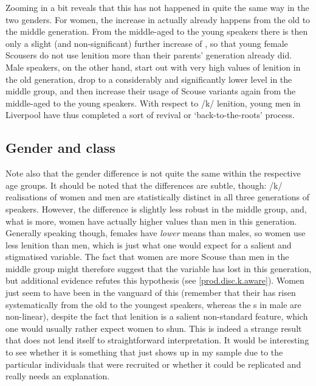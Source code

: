 Zooming in a bit reveals that this  has not happened in quite the same way in the two genders.
For women, the increase in  actually already happens from the old to the middle generation.
From the middle-aged to the young speakers there is then only a slight (and non-significant) further increase of , so that young female Scousers do not use lenition more than their parents' generation already did.
Male speakers, on the other hand, start out with very high values of lenition in the old generation, drop to a considerably and significantly lower level in the middle group, and then increase their usage of Scouse variants again from the middle-aged to the young speakers.
With respect to /k/ lenition, young men in Liverpool have thus completed a sort of revival or `back-to-the-roots' process.

\subsection{Gender and class}
\label{prod.disc.k.social}

Note also that the gender difference is not quite the same within the respective age groups.
It should be noted that the differences are subtle, though: /k/ realisations of women and men are statistically distinct in all three generations of speakers.
However, the difference is slightly less robust in the middle group, and, what is more, women have actually higher  values than men in this generation.
Generally speaking though, females have \emph{lower}  means than males, so women use less lenition than men, which is just what one would expect for a salient and stigmatised variable.
The fact that women are more Scouse than men in the middle group might therefore suggest that the variable has lost  in this generation, but additional evidence refutes this hypothesis (see \ref{prod.disc.k.aware}).
Women just seem to have been in the vanguard of this  (remember that their  has risen systematically from the old to the youngest speakers, whereas the s in male  are non-linear), despite the fact that lenition is a salient non-standard feature, which one would usually rather expect women to shun.
This is indeed a strange result that does not lend itself to straightforward interpretation.
It would be interesting to see whether it is something that just shows up in my sample due to the particular individuals that were recruited or whether it could be replicated and really needs an explanation.

